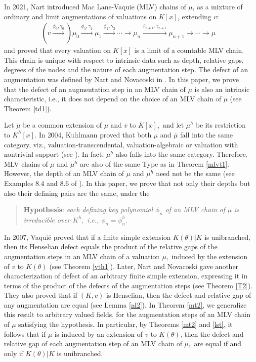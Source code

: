 \documentclass[11pt]{amsart}
\theoremstyle{definition}
\theoremstyle{remark}
\numberwithin{equation}{section}
\begin{document}
In 2021, Nart \cite{EN1} introduced Mac Lane-Vaquie (MLV) chains of $\mu$, as a mixture of ordinary and limit augmentations of valuations on $K[x]$, extending $v$:
\begin{align*}
	(v\xrightarrow{\phi_0,\gamma_0})\mu_0\xrightarrow{\phi_1,\gamma_1} \mu_1\xrightarrow{\phi_2,\gamma_2}\cdots \longrightarrow \mu_{n}\xrightarrow{\phi_{n+1},\gamma_{n+1}} \mu_{n+1}\longrightarrow\cdots\longrightarrow \mu
\end{align*}
 and proved that every valuation on $K[x]$ is a limit of a countable MLV chain. This chain is unique with respect to intrinsic data such as depth, relative gaps, degrees of the nodes and the nature of each augmentation step. The defect of an augmentation was defined by Nart and Novacoski in \cite{EN3}. In this paper, we prove that the defect of an augmentation step in an MLV chain of $\mu$ is also an intrinsic characteristic, i.e., it does not depend on the choice of an MLV chain of $\mu$ (see Theorem \ref{td1}).

Let $\overline{\mu}$ be a common extension of $\mu$ and $\bar{v}$ to $\overline{K}[x],$ and let $\mu^h$ be its restriction to $K^h[x].$ In 2004, Kuhlmann  proved that both $\mu$ and $\overline{\mu}$ fall into the same category, viz., valuation-transcendental, valuation-algebraic or valuation with nontrivial support (see \cite[Theorem 3.11]{K}). In fact, $\mu^h$ also falls into the same category. Therefore, MLV chains of $\mu$ and $\mu^h$ are also of the same Type as in Theorem \ref{mlvt1}. However, the depth of an MLV chain of $\mu$ and $\mu^h$ need not be the same (see Examples 8.4 and 8.6 of \cite{EN3}). In this paper, we prove that not only their depths but also their defining pairs are the same, under the 
\begin{quote}
{\bf Hypothesis}: {\it each defining key polynomial $\phi_n$ of an MLV chain of $\mu$ is irreducible over $K^h,$ i.e., $\phi_n=\phi_n^h.$}	
\end{quote}
\smallskip

In 2007, Vaqui\'e proved that if a finite simple extension $K(\theta)|K$ is unibranched, then its Henselian defect equals the product of the relative gaps of the augmentation steps in an MLV chain of a valuation $\mu,$ induced by the extension of $v$ to $K(\theta)$ (see Theorem \ref{vth1}). Later, Nart and Novacoski gave another characterization of defect of an arbitrary finite simple extension, expressing it in terms of the product of the defects of the augmentation steps (see Theorem \ref{T2}). They also proved that if $(K,v)$ is Henselian, then the defect and relative gap of any augmentation are equal (see Lemma \ref{nl2}). In Theorem \ref{mt2}, we generalize this result to arbitrary valued fields, for the augmentation steps of an MLV chain of $\mu$  satisfying the hypothesis. In particular, by Theorems \ref{mt2} and \ref{lst}, it follows that if $\mu$ is induced by an extension of $v$ to $K(\theta)$, then the defect and relative gap of each augmentation step of an MLV chain of $\mu,$ are equal if and only if $K(\theta)|K$ is unibranched.
\end{document}
